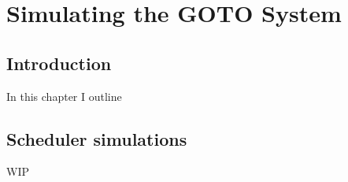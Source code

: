 \chapter{Simulating the GOTO System}
\label{chap:sims}
\chaptoc{}


\newpage
\section{Introduction}
\label{sec:sims_intro}
\begin{colsection}


\begin{colsection}

In this chapter I outline 

\end{colsection}


\end{colsection}


\newpage
\section{Scheduler simulations}
\label{sec:scheduler_sims}
\begin{colsection}


\begin{colsection}

WIP

\end{colsection}

\end{colsection}


\newpage
